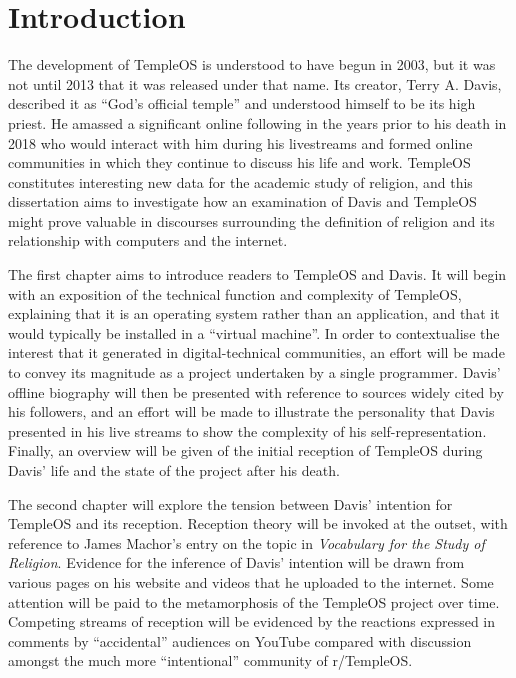 \documentclass[Draft.tex]{subfiles}
\begin{document}
\chapter*{Introduction}

The development of TempleOS is understood to have begun in 2003,
but it was not until 2013 that it was released under that name.
Its creator, Terry A. Davis, described it as ``God's official temple''
and understood himself to be its high priest.
He amassed a significant online following
in the years prior to his death in 2018
who would interact with him during his livestreams
and formed online communities
in which they continue to discuss his life and work.
TempleOS constitutes interesting new data for the academic study of religion,
and this dissertation aims to investigate how
an examination of Davis and TempleOS might prove valuable
in discourses surrounding the definition of religion
and its relationship with computers and the internet.

The first chapter aims to introduce readers to TempleOS and Davis.
It will begin with an exposition of the technical function
and complexity of TempleOS,
explaining that it is an operating system rather than an application,
and that it would typically be installed in a ``virtual machine''.
In order to contextualise the interest that it generated
in digital-technical communities, an effort will be made to convey
its magnitude as a project undertaken by a single programmer.
Davis' offline biography will then be presented
with reference to sources widely cited by his followers,
and an effort will be made to illustrate
the personality that Davis presented in his live streams
to show the complexity of his self-representation.
Finally, an overview will be given of the initial reception of TempleOS
during Davis' life and the state of the project after his death.

The second chapter will explore the tension between
Davis' intention for TempleOS and its reception.
Reception theory will be invoked at the outset,
with reference to James Machor's entry on the topic in
\textit{Vocabulary for the Study of Religion}.
Evidence for the inference of Davis' intention will be drawn from
various pages on his website and videos that he uploaded to the internet.
Some attention will be paid to
the metamorphosis of the TempleOS project over time.
Competing streams of reception will be evidenced
by the reactions expressed in comments by ``accidental'' audiences on YouTube
compared with discussion amongst the much more ``intentional''
community of r/TempleOS.
\end{document}
